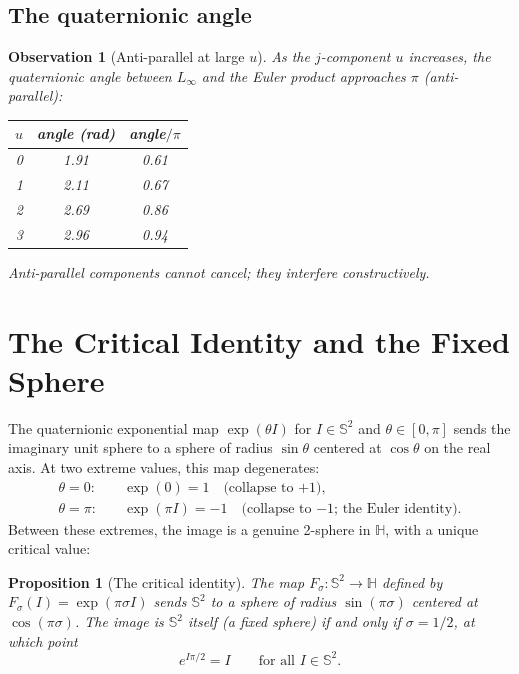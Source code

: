 \documentclass[11pt,a4paper]{article}
\newtheorem{proposition}[theorem]{Proposition}
\newtheorem{observation}[theorem]{Observation}
\theoremstyle{definition}
\begin{document}
\subsection{The quaternionic angle}

\begin{observation}[Anti-parallel at large $u$]
As the $j$-component $u$ increases, the quaternionic angle between $L_\infty$ and the Euler product approaches $\pi$ (anti-parallel):
\begin{center}
\begin{tabular}{rcc}
\toprule
$u$ & angle (rad) & angle$/\pi$ \\
\midrule
0 & 1.91 & 0.61 \\
1 & 2.11 & 0.67 \\
2 & 2.69 & 0.86 \\
3 & 2.96 & 0.94 \\
\bottomrule
\end{tabular}
\end{center}
Anti-parallel components \emph{cannot} cancel; they interfere constructively.
\end{observation}

\section{The Critical Identity and the Fixed Sphere}
\label{sec:critical}

The quaternionic exponential map $\exp(\theta I)$ for $I \in \mathbb{S}^2$ and $\theta \in [0, \pi]$ sends the imaginary unit sphere to a sphere of radius $\sin\theta$ centered at $\cos\theta$ on the real axis. At two extreme values, this map degenerates:
\begin{align*}
\theta = 0: &\quad \exp(0) = 1 \quad \text{(collapse to $+1$)}, \\
\theta = \pi: &\quad \exp(\pi I) = -1 \quad \text{(collapse to $-1$; the Euler identity)}.
\end{align*}
Between these extremes, the image is a genuine 2-sphere in $\mathbb{H}$, with a unique critical value:

\begin{proposition}[The critical identity]\label{prop:fixed-sphere}
The map $F_\sigma: \mathbb{S}^2 \to \mathbb{H}$ defined by $F_\sigma(I) = \exp(\pi\sigma I)$ sends $\mathbb{S}^2$ to a sphere of radius $\sin(\pi\sigma)$ centered at $\cos(\pi\sigma)$. The image is $\mathbb{S}^2$ itself (a fixed sphere) if and only if $\sigma = 1/2$, at which point
\begin{equation}\label{eq:critical-identity}
e^{I\pi/2} = I \qquad \text{for all } I \in \mathbb{S}^2.
\end{equation}
\end{proposition}
\end{document}
